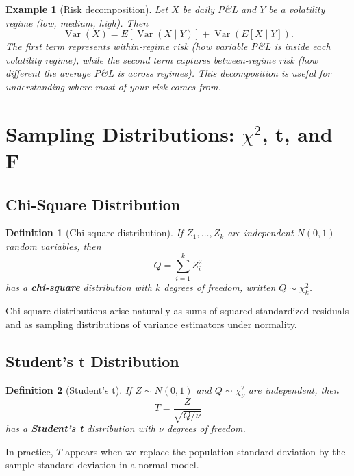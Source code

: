 \documentclass[11pt,a4paper]{article}
\newtheorem{definition}{Definition}[section]
\newtheorem{example}{Example}[section]
\begin{document}
\begin{example}[Risk decomposition]
Let $X$ be daily P\&L and $Y$ be a volatility regime (low, medium, high). 
Then
\[
\operatorname{Var}(X) = E[\operatorname{Var}(X \mid Y)] + \operatorname{Var}(E[X \mid Y]).
\]
The first term represents within-regime risk (how variable P\&L is inside each volatility regime), while the second term captures between-regime risk (how different the average P\&L is across regimes). 
This decomposition is useful for understanding where most of your risk comes from.

\end{example}

\newpage

\section{Sampling Distributions: \texorpdfstring{$\chi^2$}{chi-square}, t, and F}
\label{sec:sampling-dists}

\subsection{Chi-Square Distribution}

\begin{definition}[Chi-square distribution]
If $Z_1,\dots,Z_k$ are independent $N(0,1)$ random variables, then
\[
Q = \sum_{i=1}^k Z_i^2
\]
has a \textbf{chi-square} distribution with $k$ degrees of freedom, written $Q \sim \chi_k^2$.
\end{definition}

Chi-square distributions arise naturally as sums of squared standardized residuals and as sampling distributions of variance estimators under normality.

\subsection{Student's t Distribution}

\begin{definition}[Student's t]
If $Z \sim N(0,1)$ and $Q \sim \chi_\nu^2$ are independent, then
\[
T = \frac{Z}{\sqrt{Q/\nu}}
\]
has a \textbf{Student's t} distribution with $\nu$ degrees of freedom.
\end{definition}

In practice, $T$ appears when we replace the population standard deviation by the sample standard deviation in a normal model.
\end{document}
